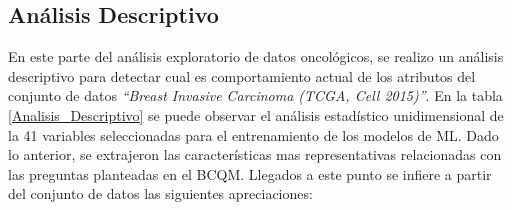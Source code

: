 \clearpage	
\newpage
\subsection{Análisis Descriptivo }
En este parte del análisis exploratorio de datos oncológicos, se realizo un análisis descriptivo para detectar cual es comportamiento actual de los atributos del conjunto de datos \textit{“Breast Invasive Carcinoma (TCGA, Cell 2015)”}. En la tabla \ref{Analisis_Descriptivo} se puede observar el análisis estadístico unidimensional de la 41 variables seleccionadas para el entrenamiento de los modelos de ML. Dado lo anterior, se extrajeron las características mas representativas relacionadas con las preguntas planteadas en el BCQM. Llegados a este punto se infiere a partir del conjunto de datos las siguientes apreciaciones:

